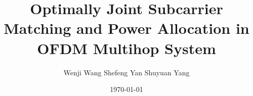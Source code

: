 

\title[Joint Subcarrier Matching and Power All.]{Optimally Joint Subcarrier Matching and Power Allocation in OFDM Multihop System}
\author[Wenji Wang]{Wenji Wang 
        Shefeng Yan 
        Shuyuan Yang}
\date{\today}



\let\olditem=\item%
\renewcommand{\item}{\olditem \justifying}%

\newcommand{\AtBeginSec}
{
\frame{\tableofcontents[currentsection]}
}

\newcommand{\ft}{\frametitle}


\begin{frame}
 \titlepage
\end{frame}














